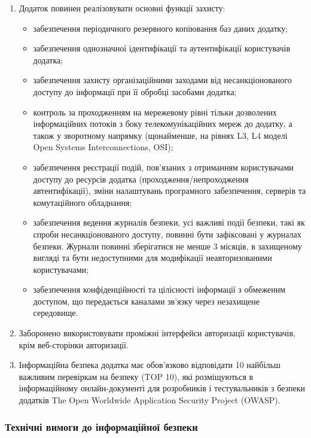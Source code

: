 \documentclass{article}
\begin{document}
\begin{enumerate}
  \item Додаток повинен реалізовувати основні функції захисту:
    \begin{itemize}
      \item забезпечення періодичного резервного копіювання баз даних додатку;
      \item забезпечення однозначної ідентифікації та аутентифікації користувачів додатка;
      \item забезпечення захисту організаційними заходами від несанкціонованого доступу до інформації при її обробці засобами додатка;
      \item контроль за проходженням на мережевому рівні тільки дозволених інформаційних потоків з боку телекомунікаційних мереж до додатку, а також у зворотному напрямку (щонайменше, на рівнях L3, L4 моделі Open Systems Interconnections, OSI);
      \item забезпечення реєстрації подій, пов’язаних з отриманням користувачами доступу до ресурсів додатка (проходження/непроходження автентифікації), зміни налаштувань програмного забезпечення, серверів та комутаційного обладнання;
      \item забезпечення ведення журналів безпеки, усі важливі події безпеки, такі як спроби несанкціонованого доступу, повинні бути зафіксовані у журналах безпеки. Журнали повинні зберігатися не менше 3 місяців, в захищеному вигляді та бути недоступними для модифікації неавторизованими користувачами;
      \item забезпечення конфіденційності та цілісності інформації з обмеженим доступом, що передається каналами зв’язку через незахищене середовище.
    \end{itemize}

  \item Заборонено використовувати проміжні інтерфейси авторизації користувачів, крім веб-сторінки авторизації.

  \item Інформаційна безпека додатка має обов’язково відповідати 10 найбільш важливим перевіркам на безпеку (TOP 10),
        які розміщуються в інформаційному онлайн-документі для розробників і тестувальників з безпеки додатків The
        Open Worldwide Application Security Project (OWASP).
\end{enumerate}

\newpage
\subsubsection{Технічні вимоги до інформаційної безпеки}
\end{document}

